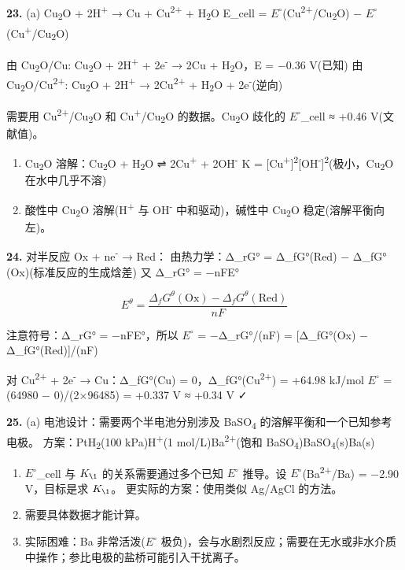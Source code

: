 \documentclass[a4paper,11pt]{ctexart}
\begin{document}
\textbf{23.}
(a) Cu\textsubscript{2}O + 2H\textsuperscript{+} → Cu + Cu\textsuperscript{2+} + H\textsubscript{2}O
E\_cell = \(E^{\circ}\)(Cu\textsuperscript{2+}/Cu\textsubscript{2}O) − \(E^{\circ}\)(Cu\textsuperscript{+}/Cu\textsubscript{2}O)

由 Cu\textsubscript{2}O/Cu: Cu\textsubscript{2}O + 2H\textsuperscript{+} + 2e\textsuperscript{-} → 2Cu + H\textsubscript{2}O，E = −0.36 V(已知)
由 Cu\textsubscript{2}O/Cu\textsuperscript{2+}: Cu\textsubscript{2}O + 2H\textsuperscript{+} → 2Cu\textsuperscript{2+} + H\textsubscript{2}O + 2e\textsuperscript{-}(逆向)

需要用 Cu\textsuperscript{2+}/Cu\textsubscript{2}O 和 Cu\textsuperscript{+}/Cu\textsubscript{2}O 的数据。Cu\textsubscript{2}O 歧化的 \(E^{\circ}\)\_cell ≈ +0.46 V(文献值)。

\begin{enumerate}
\def\labelenumi{(\alph{enumi})}
\setcounter{enumi}{1}
\item
  Cu\textsubscript{2}O 溶解：Cu\textsubscript{2}O + H\textsubscript{2}O ⇌ 2Cu\textsuperscript{+} + 2OH\textsuperscript{-}
  K = {[}Cu\textsuperscript{+}{]}\textsuperscript{2}{[}OH\textsuperscript{-}{]}\textsuperscript{2}(极小，Cu\textsubscript{2}O 在水中几乎不溶)
\item
  酸性中 Cu\textsubscript{2}O 溶解(H\textsuperscript{+} 与 OH\textsuperscript{-} 中和驱动)，碱性中 Cu\textsubscript{2}O 稳定(溶解平衡向左)。
\end{enumerate}

\textbf{24.} 对半反应 Ox + ne\textsuperscript{-} → Red：
由热力学：Δ\_rG° = Δ\_fG°(Red) − Δ\_fG°(Ox)(标准反应的生成焓差)
又 Δ\_rG° = −nFE°

\[E^\theta = \frac{\Delta_f G^\theta(\mathrm{Ox}) - \Delta_f G^\theta(\mathrm{Red})}{nF}\]

注意符号：Δ\_rG° = −nFE°，所以 \(E^{\circ}\) = −Δ\_rG°/(nF) = {[}Δ\_fG°(Ox) − Δ\_fG°(Red){]}/(nF)

对 Cu\textsuperscript{2+} + 2e\textsuperscript{-} → Cu：Δ\_fG°(Cu) = 0，Δ\_fG°(Cu\textsuperscript{2+}) = +64.98 kJ/mol
\(E^{\circ}\) = (64980 − 0)/(2×96485) = +0.337 V ≈ +0.34 V ✓

\textbf{25.}
(a) 电池设计：需要两个半电池分别涉及 BaSO\textsubscript{4} 的溶解平衡和一个已知参考电极。
方案：Pt\textbar H\textsubscript{2}(100 kPa)\textbar H\textsuperscript{+}(1 mol/L)\textbar\textbar Ba\textsuperscript{2+}(饱和 BaSO\textsubscript{4})\textbar BaSO\textsubscript{4}(s)\textbar Ba(s)

\begin{enumerate}
\def\labelenumi{(\alph{enumi})}
\setcounter{enumi}{1}
\item
  \(E^{\circ}\)\_cell 与 \(K_{\1}\) 的关系需要通过多个已知 \(E^{\circ}\) 推导。设 \(E^{\circ}\)(Ba\textsuperscript{2+}/Ba) = −2.90 V，目标是求 \(K_{\1}\)。
  更实际的方案：使用类似 Ag/AgCl 的方法。
\item
  需要具体数据才能计算。
\item
  实际困难：Ba 非常活泼(\(E^{\circ}\) 极负)，会与水剧烈反应；需要在无水或非水介质中操作；参比电极的盐桥可能引入干扰离子。
\end{enumerate}
\end{document}
